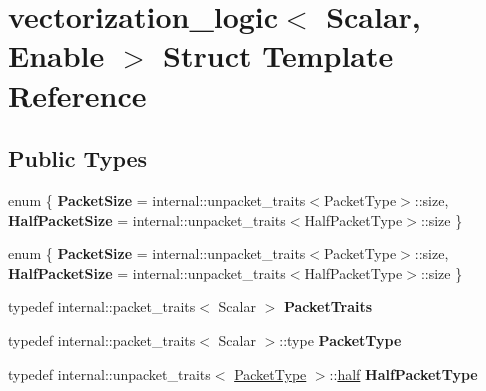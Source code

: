 \hypertarget{structvectorization__logic}{}\section{vectorization\+\_\+logic$<$ Scalar, Enable $>$ Struct Template Reference}
\label{structvectorization__logic}
\subsection*{Public Types}
\begin{DoxyCompactItemize}
\item 
\mbox{\label{structvectorization__logic_afaced4272bc763325b704600df868ca3}} 
enum \{ {\bfseries Packet\+Size} = internal\+:\+:unpacket\+\_\+traits$<$Packet\+Type$>$\+:\+:size, 
{\bfseries Half\+Packet\+Size} = internal\+:\+:unpacket\+\_\+traits$<$Half\+Packet\+Type$>$\+:\+:size
 \}
\item 
\mbox{\label{structvectorization__logic_a22f2304b4177b2b8d7422ee1be92ae58}} 
enum \{ {\bfseries Packet\+Size} = internal\+:\+:unpacket\+\_\+traits$<$Packet\+Type$>$\+:\+:size, 
{\bfseries Half\+Packet\+Size} = internal\+:\+:unpacket\+\_\+traits$<$Half\+Packet\+Type$>$\+:\+:size
 \}
\item 
\mbox{\label{structvectorization__logic_a8302b72dbfebe79bdd79f55c106c4fd0}} 
typedef internal\+::packet\+\_\+traits$<$ Scalar $>$ {\bfseries Packet\+Traits}
\item 
\mbox{\label{structvectorization__logic_a01f668e8607439c864cf203c5fc13fbb}} 
typedef internal\+::packet\+\_\+traits$<$ Scalar $>$\+::type {\bfseries Packet\+Type}
\item 
\mbox{\label{structvectorization__logic_a29280e414cd26c38ce92dc364610fbb7}} 
typedef internal\+::unpacket\+\_\+traits$<$ \hyperlink{group___sparse_core___module}{Packet\+Type} $>$\+::\hyperlink{struct_eigen_1_1half}{half} {\bfseries Half\+Packet\+Type}
\item 
\mbox{\label{structvectorization__logic_a8302b72dbfebe79bdd79f55c106c4fd0}} 

\end{DoxyCompactItemize}
